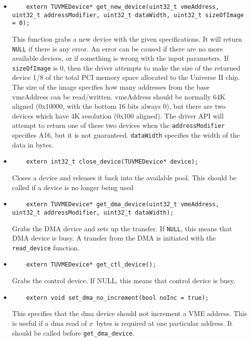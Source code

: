 			\begin{itemize}
			\item\begin{lstlisting}
	extern TUVMEDevice* get_new_device(uint32_t vmeAddress, uint32_t addressModifier, uint32_t dataWidth, uint32_t sizeOfImage = 0);
			\end{lstlisting}
  This function grabs a new device with the given specifications. It will return \lstinline!NULL! if there is any error. 
  An error can be caused if there are no more available devices, or if something is wrong with the input parameters. 
  If \lstinline!sizeOfImage! is 0, then the driver attempts to make the size of the returned device 1/8 of the total PCI memory
  space allocated to the Universe II chip. 
  The size of the image specifies how many addresses from the base vmeAddress can be read/written. 
  vmeAddress should be normally 64K aligned (0x10000, with the bottom 16 bits always 0), but there are 
  two devices which have 4K resolution (0x100 aligned).  The driver API will attempt to return one of these
  two devices when the \lstinline!addressModifier! specifies A16, but it is not guaranteed.  
  \lstinline!dataWidth! specifies the width of the data in bytes. 

			\item\begin{lstlisting}
	extern int32_t close_device(TUVMEDevice* device);
			\end{lstlisting}
Closes a device and releases it back into the available pool.  This should be called if a device is no longer being used

			\item\begin{lstlisting}
	extern TUVMEDevice* get_dma_device(uint32_t vmeAddress, uint32_t addressModifier, uint32_t dataWidth);
			\end{lstlisting}
Grabs the DMA device and sets up the transfer.  If \lstinline!NULL!, this means that DMA device is busy.
A transfer from the DMA is initiated with the \lstinline!read_device! function.

			\item\begin{lstlisting}
	extern TUVMEDevice* get_ctl_device();
			\end{lstlisting}
Grabs the control device.  If NULL, this means that control device is busy.

			\item\begin{lstlisting}
	extern void set_dma_no_increment(bool noInc = true);
			\end{lstlisting}
This specifies that the dma device should not increment a VME address. This is useful if a dma read
of $x$~bytes is required at one particular address.  It should be called before \lstinline!get_dma_device!.


\end{itemize}
